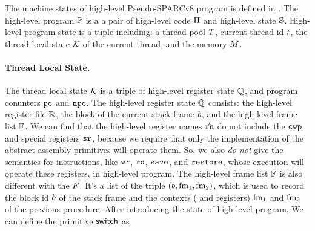 The machine states of high-level Pseudo-SPARCv8 program 
is defined in \Fig{\ref{fig:machine-state-concur-pseudo-sparc}}. 
The high-level program $\mathbb{P}$ is a a pair of high-level code 
$\Pi$ and high-level state $\mathbb{S}$. High-level program 
state is a tuple including: a thread pool $T$, 
current thread id $t$, the thread local state 
$\mathcal{K}$ of the current thread, and the memory $M$.

\paragraph{\textbf{Thread Local State.}} 
The thread local state $\mathcal{K}$ 
is a triple of high-level register state $\mathbb{Q}$, 
and program conunters $\texttt{pc}$ and $\texttt{npc}$. The high-level 
register state $\mathbb{Q}$ consists: 
the high-level register file $\mathbb{R}$, 
the block of the current stack frame $b$, 
and the high-level frame list $\mathbb{F}$. 
We can find that the high-level register names $\hat{\texttt{rn}}$ 
do not include the $\texttt{cwp}$ and special registers 
$\texttt{sr}$, because we require that only the implementation 
of the abstract assembly primitives will operate them. 
So, we also {\it do not} give the semantics for instructions,
like $\texttt{wr}$, $\texttt{rd}{}$, $\texttt{save}{}$, and $\texttt{restore}{}$, 
whose  execution will operate these registers, 
in high-level program. 
The high-level frame list $\mathbb{F}$ is also different with 
the $F$. It's a list of the triple 
$(b, \text{fm}_1, \text{fm}_2)$, which is used to record 
the block id $b$ of the stack frame and  
the contexts (\localRN{} and \inRN{} registers) 
$\text{fm}_1$ and $\text{fm}_2$ of the previous procedure.
After introducing the state of high-level program, 
We can define the primitive $\mathsf{switch}$ as 
